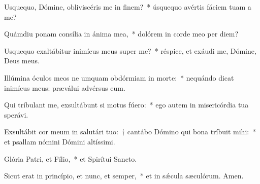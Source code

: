 \item Usquequo, Dómine, obliviscéris me in finem?~* úsquequo avértis fáciem tuam a me?

\item Quámdiu ponam consília in ánima mea,~* dolórem in corde meo per diem?

\item Usquequo exaltábitur inimícus meus super me?~* réspice, et exáudi me, Dómine, Deus meus.

\item Illúmina óculos meos ne umquam obdórmiam in morte:~* nequándo dicat inimícus meus: præválui advérsus eum.

\item Qui tríbulant me, exsultábunt si motus fúero:~* ego autem in misericórdia tua sperávi.

\item Exsultábit cor meum in salutári tuo:~† cantábo Dómino qui bona tríbuit mihi:~* et psallam nómini Dómini altíssimi.

\item Glória Patri, et Fílio,~* et Spirítui Sancto.

\item Sicut erat in princípio, et nunc, et semper,~* et in sǽcula sæculórum. Amen.

